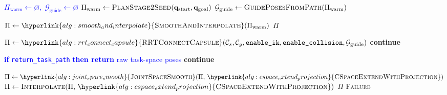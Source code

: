 \documentclass[11pt]{article}
\newcommand{\Continue}{\State \textbf{continue}}
\newcommand{\chg}[1]{\textcolor{blue}{#1}}
\newcommand{\AlgLink}[2]{\hyperlink{#1}{#2}}
\begin{document}
\begin{algorithm}[H]
\begin{algorithmic}[1]
\State \chg{$\Pi_{\text{warm}} \gets \varnothing,\; \mathcal{G}_{\text{guide}} \gets \varnothing$}
  \State \chg{$\Pi_{\text{warm}} \gets \textsc{PlanStage2Seed}(\mathbf{q}_{\text{start}}, \mathbf{q}_{\text{goal}})$}
  \State \chg{$\mathcal{G}_{\text{guide}} \gets \textsc{GuidePosesFromPath}(\Pi_{\text{warm}})$}
\EndIf

    \State \chg{$\Pi \gets \AlgLink{alg:smooth_and_interpolate}{\textsc{SmoothAndInterpolate}}(\Pi_{\text{warm}})$}
    \If{$\Pi \neq \varnothing$} \Return $\Pi$ \EndIf
  \EndIf

  \State \chg{$\Pi \gets \AlgLink{alg:rrt_connect_capsule}{\textsc{RRTConnectCapsule}}(\mathcal{C}_s,\mathcal{C}_g,\texttt{enable\_ik},\texttt{enable\_collision},\mathcal{G}_{\text{guide}})$}
  \If{$\Pi = \varnothing$} \Continue \EndIf

    \State \chg{\textbf{if} \texttt{return\_task\_path} \textbf{then return} raw task-space poses}
    \Continue
  \EndIf

  \State $\Pi \gets \AlgLink{alg:joint_space_smooth}{\textsc{JointSpaceSmooth}}\!\left(\Pi,\, \AlgLink{alg:cspace_extend_projection}{\textsc{CSpaceExtendWithProjection}}\right)$
  \State $\Pi \gets \textsc{Interpolate}\!\left(\Pi,\, \AlgLink{alg:cspace_extend_projection}{\textsc{CSpaceExtendWithProjection}}\right)$
  \If{$\Pi \neq \varnothing$} \Return $\Pi$ \EndIf
\EndFor
\State \Return \textsc{Failure}
\end{algorithmic}
\end{algorithm}

\end{document}
